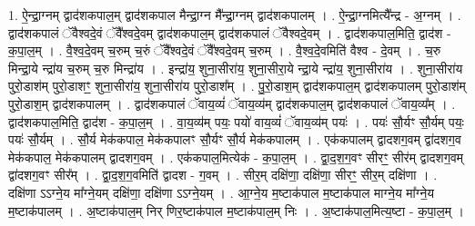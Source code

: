 \documentclass[17pt]{extarticle}
\begin{document}
1. ऐ॒न्द्रा॒ग्नम् द्वाद॑शकपाल॒म् द्वाद॑शकपाल मैन्द्रा॒ग्न मै᳚न्द्रा॒ग्नम् द्वाद॑शकपालम् । . ऐ॒न्द्रा॒ग्नमित्यै᳚न्द्र - अ॒ग्नम् । . द्वाद॑शकपालं ॅवैश्वदे॒वं ॅवै᳚श्वदे॒वम् द्वाद॑शकपाल॒म् द्वाद॑शकपालं ॅवैश्वदे॒वम् । . द्वाद॑शकपाल॒मिति॒ द्वाद॑श - क॒पा॒ल॒म् । . वै॒श्व॒दे॒वम् च॒रुम् च॒रुं ॅवै᳚श्वदे॒वं ॅवै᳚श्वदे॒वम् च॒रुम् । . वै॒श्व॒दे॒वमिति॑ वैश्व - दे॒वम् । . च॒रु मिन्द्रा॒ये न्द्रा॑य च॒रुम् च॒रु मिन्द्रा॑य । . इन्द्रा॑य॒ शुना॒सीरा॑य॒ शुना॒सीरा॒ये न्द्रा॒ये न्द्रा॑य॒ शुना॒सीरा॑य । . शुना॒सीरा॑य पुरो॒डाश॑म् पुरो॒डाशꣳ॒॒ शुना॒सीरा॑य॒ शुना॒सीरा॑य पुरो॒डाश᳚म् । . पु॒रो॒डाश॒म् द्वाद॑शकपाल॒म् द्वाद॑शकपालम् पुरो॒डाश॑म् पुरो॒डाश॒म् द्वाद॑शकपालम् । . द्वाद॑शकपालं ॅवाय॒व्यं॑ ॅवाय॒व्य॑म् द्वाद॑शकपाल॒म् द्वाद॑शकपालं ॅवाय॒व्य᳚म् । . द्वाद॑शकपाल॒मिति॒ द्वाद॑श - क॒पा॒ल॒म् । . वा॒य॒व्य॑म् पयः॒ पयो॑ वाय॒व्यं॑ ॅवाय॒व्य॑म् पयः॑ । . पयः॑ सौ॒र्यꣳ सौ॒र्यम् पयः॒ पयः॑ सौ॒र्यम् । . सौ॒र्य मेक॑कपाल॒ मेक॑कपालꣳ सौ॒र्यꣳ सौ॒र्य मेक॑कपालम् । . एक॑कपालम् द्वादशग॒वम् द्वा॑दशग॒व मेक॑कपाल॒ मेक॑कपालम् द्वादशग॒वम् । . एक॑कपाल॒मित्येक॑ - क॒पा॒ल॒म् । . द्वा॒द॒श॒ग॒वꣳ सीरꣳ॒॒ सीर॑म् द्वादशग॒वम् द्वा॑दशग॒वꣳ सीर᳚म् । . द्वा॒द॒श॒ग॒वमिति॑ द्वादश - ग॒वम् । . सीर॒म् दक्षि॑णा॒ दक्षि॑णा॒ सीरꣳ॒॒ सीर॒म् दक्षि॑णा । . दक्षि॑णा ऽऽग्ने॒य मा᳚ग्ने॒यम् दक्षि॑णा॒ दक्षि॑णा ऽऽग्ने॒यम् । . आ॒ग्ने॒य म॒ष्टाक॑पाल म॒ष्टाक॑पाल माग्ने॒य मा᳚ग्ने॒य म॒ष्टाक॑पालम् । . अ॒ष्टाक॑पाल॒म् निर् णिर॒ष्टाक॑पाल म॒ष्टाक॑पाल॒म् निः । . अ॒ष्टाक॑पाल॒मित्य॒ष्टा - क॒पा॒ल॒म् । \newline
\end{document}
